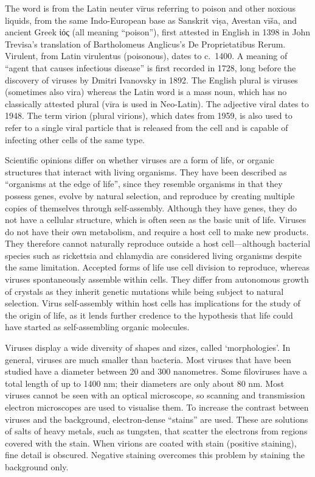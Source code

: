 The word is from the Latin neuter vīrus referring to poison and other noxious liquids, from the same Indo-European base as Sanskrit viṣa, Avestan vīša, and ancient Greek ἰός (all meaning ``poison''), first attested in English in 1398 in John Trevisa's translation of Bartholomeus Anglicus's De Proprietatibus Rerum. Virulent, from Latin virulentus (poisonous), dates to c.~1400. A meaning of ``agent that causes infectious disease'' is first recorded in 1728, long before the discovery of viruses by Dmitri Ivanovsky in 1892. The English plural is viruses (sometimes also vira) whereas the Latin word is a mass noun, which has no classically attested plural (vīra is used in Neo-Latin). The adjective viral dates to 1948. The term virion (plural virions), which dates from 1959, is also used to refer to a single viral particle that is released from the cell and is capable of infecting other cells of the same type.

Scientific opinions differ on whether viruses are a form of life, or organic structures that interact with living organisms. They have been described as ``organisms at the edge of life'', since they resemble organisms in that they possess genes, evolve by natural selection, and reproduce by creating multiple copies of themselves through self-assembly. Although they have genes, they do not have a cellular structure, which is often seen as the basic unit of life. Viruses do not have their own metabolism, and require a host cell to make new products. They therefore cannot naturally reproduce outside a host cell---although bacterial species such as rickettsia and chlamydia are considered living organisms despite the same limitation. Accepted forms of life use cell division to reproduce, whereas viruses spontaneously assemble within cells. They differ from autonomous growth of crystals as they inherit genetic mutations while being subject to natural selection. Virus self-assembly within host cells has implications for the study of the origin of life, as it lends further credence to the hypothesis that life could have started as self-assembling organic molecules.

Viruses display a wide diversity of shapes and sizes, called `morphologies'. In general, viruses are much smaller than bacteria. Most viruses that have been studied have a diameter between 20 and 300 nanometres. Some filoviruses have a total length of up to 1400 nm; their diameters are only about 80 nm. Most viruses cannot be seen with an optical microscope, so scanning and transmission electron microscopes are used to visualise them. To increase the contrast between viruses and the background, electron-dense ``stains'' are used. These are solutions of salts of heavy metals, such as tungsten, that scatter the electrons from regions covered with the stain. When virions are coated with stain (positive staining), fine detail is obscured. Negative staining overcomes this problem by staining the background only.

